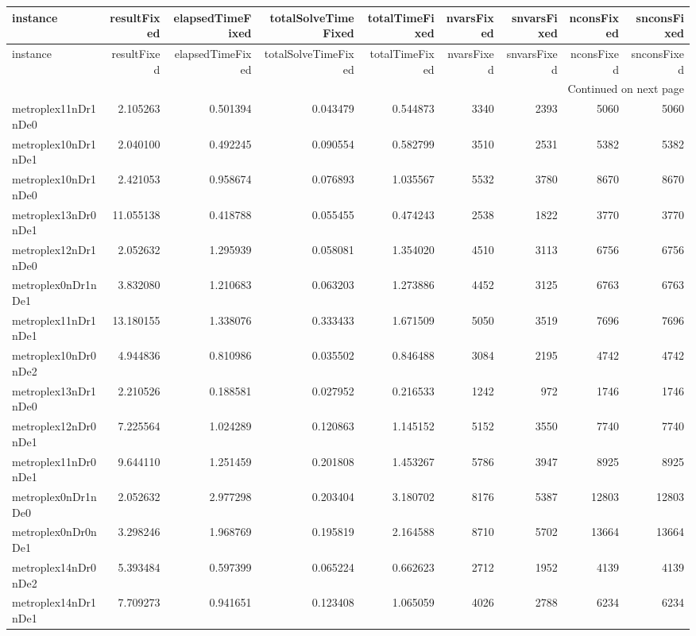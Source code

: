 \begin{longtable}{|l|r|r|r|r|r|r|r|r|}
\toprule
instance & resultFixed & elapsedTimeFixed & totalSolveTimeFixed & totalTimeFixed & nvarsFixed & snvarsFixed & nconsFixed & snconsFixed \\
\midrule
\endfirsthead
\toprule
instance & resultFixed & elapsedTimeFixed & totalSolveTimeFixed & totalTimeFixed & nvarsFixed & snvarsFixed & nconsFixed & snconsFixed \\
\midrule
\endhead
\midrule
\multicolumn{9}{r}{Continued on next page} \\
\midrule
\endfoot
\bottomrule
\endlastfoot
metroplex11nDr1nDe0 & 2.105263 & 0.501394 & 0.043479 & 0.544873 & 3340 & 2393 & 5060 & 5060 \\
metroplex10nDr1nDe1 & 2.040100 & 0.492245 & 0.090554 & 0.582799 & 3510 & 2531 & 5382 & 5382 \\
metroplex10nDr1nDe0 & 2.421053 & 0.958674 & 0.076893 & 1.035567 & 5532 & 3780 & 8670 & 8670 \\
metroplex13nDr0nDe1 & 11.055138 & 0.418788 & 0.055455 & 0.474243 & 2538 & 1822 & 3770 & 3770 \\
metroplex12nDr1nDe0 & 2.052632 & 1.295939 & 0.058081 & 1.354020 & 4510 & 3113 & 6756 & 6756 \\
metroplex0nDr1nDe1 & 3.832080 & 1.210683 & 0.063203 & 1.273886 & 4452 & 3125 & 6763 & 6763 \\
metroplex11nDr1nDe1 & 13.180155 & 1.338076 & 0.333433 & 1.671509 & 5050 & 3519 & 7696 & 7696 \\
metroplex10nDr0nDe2 & 4.944836 & 0.810986 & 0.035502 & 0.846488 & 3084 & 2195 & 4742 & 4742 \\
metroplex13nDr1nDe0 & 2.210526 & 0.188581 & 0.027952 & 0.216533 & 1242 & 972 & 1746 & 1746 \\
metroplex12nDr0nDe1 & 7.225564 & 1.024289 & 0.120863 & 1.145152 & 5152 & 3550 & 7740 & 7740 \\
metroplex11nDr0nDe1 & 9.644110 & 1.251459 & 0.201808 & 1.453267 & 5786 & 3947 & 8925 & 8925 \\
metroplex0nDr1nDe0 & 2.052632 & 2.977298 & 0.203404 & 3.180702 & 8176 & 5387 & 12803 & 12803 \\
metroplex0nDr0nDe1 & 3.298246 & 1.968769 & 0.195819 & 2.164588 & 8710 & 5702 & 13664 & 13664 \\
metroplex14nDr0nDe2 & 5.393484 & 0.597399 & 0.065224 & 0.662623 & 2712 & 1952 & 4139 & 4139 \\
metroplex14nDr1nDe1 & 7.709273 & 0.941651 & 0.123408 & 1.065059 & 4026 & 2788 & 6234 & 6234 \\

\end{longtable}
